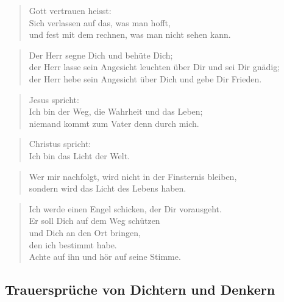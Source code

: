 \documentclass[ngerman,a4paper,11pt]{scrreprt}
\begin{document}
\begin{verse}
Gott vertrauen heisst: \\
Sich verlassen auf das, was man hofft, \\
und fest mit dem rechnen, was man nicht sehen kann. \\
\end{verse}

\begin{verse}
Der Herr segne Dich und behüte Dich; \\
der Herr lasse sein Angesicht leuchten über Dir und sei Dir gnädig; \\
der Herr hebe sein Angesicht über Dich und gebe Dir Frieden. \\
\end{verse}

\begin{verse}
Jesus spricht: \\
Ich bin der Weg, die Wahrheit und das Leben; \\
niemand kommt zum Vater denn durch mich. \\
\end{verse}

\begin{verse}
Christus spricht: \\
Ich bin das Licht der Welt. \\
\end{verse}

\begin{verse}
Wer mir nachfolgt, wird nicht in der Finsternis bleiben, \\
sondern wird das Licht des Lebens haben. \\
\end{verse}

\begin{verse}
Ich werde einen Engel schicken, der Dir vorausgeht. \\
Er soll Dich auf dem Weg schützen \\
und Dich an den Ort bringen, \\
den ich bestimmt habe. \\
Achte auf ihn und hör auf seine Stimme. \\
\end{verse}

\subsection{Trauersprüche von Dichtern und Denkern}
\label{sec-2-1-2-3}
\end{document}
